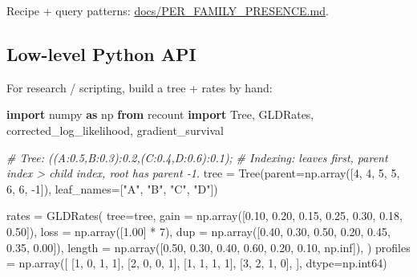\documentclass[
  10pt,
]{article}
\newenvironment{Shaded}{}{}
\newcommand{\CommentTok}[1]{\textcolor[rgb]{0.38,0.63,0.69}{\textit{#1}}}
\newcommand{\DecValTok}[1]{\textcolor[rgb]{0.25,0.63,0.44}{#1}}
\newcommand{\FloatTok}[1]{\textcolor[rgb]{0.25,0.63,0.44}{#1}}
\newcommand{\ImportTok}[1]{\textcolor[rgb]{0.00,0.50,0.00}{\textbf{#1}}}
\newcommand{\NormalTok}[1]{#1}
\newcommand{\OperatorTok}[1]{\textcolor[rgb]{0.40,0.40,0.40}{#1}}
\newcommand{\StringTok}[1]{\textcolor[rgb]{0.25,0.44,0.63}{#1}}
\begin{document}
Recipe + query patterns: \url{docs/PER_FAMILY_PRESENCE.md}.

\subsection{Low-level Python API}\label{low-level-python-api}

For research / scripting, build a tree + rates by hand:

\begin{Shaded}
\begin{Highlighting}[]
\ImportTok{import}\NormalTok{ numpy }\ImportTok{as}\NormalTok{ np}
\ImportTok{from}\NormalTok{ recount }\ImportTok{import}\NormalTok{ Tree, GLDRates, corrected\_log\_likelihood, gradient\_survival}

\CommentTok{\# Tree: ((A:0.5,B:0.3):0.2,(C:0.4,D:0.6):0.1);}
\CommentTok{\# Indexing: leaves first, parent index \textgreater{} child index, root has parent {-}1.}
\NormalTok{tree }\OperatorTok{=}\NormalTok{ Tree(parent}\OperatorTok{=}\NormalTok{np.array([}\DecValTok{4}\NormalTok{, }\DecValTok{4}\NormalTok{, }\DecValTok{5}\NormalTok{, }\DecValTok{5}\NormalTok{, }\DecValTok{6}\NormalTok{, }\DecValTok{6}\NormalTok{, }\OperatorTok{{-}}\DecValTok{1}\NormalTok{]),}
\NormalTok{            leaf\_names}\OperatorTok{=}\NormalTok{[}\StringTok{"A"}\NormalTok{, }\StringTok{"B"}\NormalTok{, }\StringTok{"C"}\NormalTok{, }\StringTok{"D"}\NormalTok{])}

\NormalTok{rates }\OperatorTok{=}\NormalTok{ GLDRates(}
\NormalTok{    tree}\OperatorTok{=}\NormalTok{tree,}
\NormalTok{    gain   }\OperatorTok{=}\NormalTok{ np.array([}\FloatTok{0.10}\NormalTok{, }\FloatTok{0.20}\NormalTok{, }\FloatTok{0.15}\NormalTok{, }\FloatTok{0.25}\NormalTok{, }\FloatTok{0.30}\NormalTok{, }\FloatTok{0.18}\NormalTok{, }\FloatTok{0.50}\NormalTok{]),}
\NormalTok{    loss   }\OperatorTok{=}\NormalTok{ np.array([}\FloatTok{1.00}\NormalTok{] }\OperatorTok{*} \DecValTok{7}\NormalTok{),}
\NormalTok{    dup    }\OperatorTok{=}\NormalTok{ np.array([}\FloatTok{0.40}\NormalTok{, }\FloatTok{0.30}\NormalTok{, }\FloatTok{0.50}\NormalTok{, }\FloatTok{0.20}\NormalTok{, }\FloatTok{0.45}\NormalTok{, }\FloatTok{0.35}\NormalTok{, }\FloatTok{0.00}\NormalTok{]),}
\NormalTok{    length }\OperatorTok{=}\NormalTok{ np.array([}\FloatTok{0.50}\NormalTok{, }\FloatTok{0.30}\NormalTok{, }\FloatTok{0.40}\NormalTok{, }\FloatTok{0.60}\NormalTok{, }\FloatTok{0.20}\NormalTok{, }\FloatTok{0.10}\NormalTok{, np.inf]),}
\NormalTok{)}
\NormalTok{profiles }\OperatorTok{=}\NormalTok{ np.array([}
\NormalTok{    [}\DecValTok{1}\NormalTok{, }\DecValTok{0}\NormalTok{, }\DecValTok{1}\NormalTok{, }\DecValTok{1}\NormalTok{],}
\NormalTok{    [}\DecValTok{2}\NormalTok{, }\DecValTok{0}\NormalTok{, }\DecValTok{0}\NormalTok{, }\DecValTok{1}\NormalTok{],}
\NormalTok{    [}\DecValTok{1}\NormalTok{, }\DecValTok{1}\NormalTok{, }\DecValTok{1}\NormalTok{, }\DecValTok{1}\NormalTok{],}
\NormalTok{    [}\DecValTok{3}\NormalTok{, }\DecValTok{2}\NormalTok{, }\DecValTok{1}\NormalTok{, }\DecValTok{0}\NormalTok{],}
\NormalTok{], dtype}\OperatorTok{=}\NormalTok{np.int64)}


\end{Highlighting}
\end{Shaded}
\end{document}
